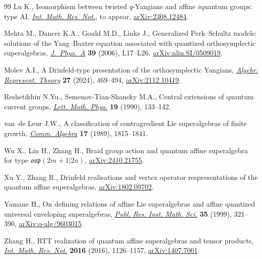 \begin{thebibliography}{99}
Lu K., Isomorphism between twisted $q$-Yangians and affine $i$quantum groups:
 type AI, \href{https://doi.org/10.1093/imrn/rnae248}{\textit{Int. Math. Res. Not.}}, {t}o appear, \href{https://arxiv.org/abs/2308.12484}{arXiv:2308.12484}.

Mehta M., Dancer K.A., Gould M.D., Links J., Generalized {P}erk--{S}chultz
 models: solutions of the {Y}ang--{B}axter equation associated with quantized
 orthosymplectic superalgebras, \href{https://doi.org/10.1088/0305-4470/39/1/L03}{\textit{J.~Phys.~A}} \textbf{39} (2006),
 L17--L26, \href{https://arxiv.org/abs/nlin.SI/0509019}{arXiv:nlin.SI/0509019}.

Molev A.I., A {D}rinfeld-type presentation of the orthosymplectic {Y}angians,
 \href{https://doi.org/10.1007/s10468-023-10227-9}{\textit{Algebr. Represent. Theory}} \textbf{27} (2024), 469--494,
 \href{https://arxiv.org/abs/2112.10419}{arXiv:2112.10419}.

Reshetikhin N.Yu., Semenov-Tian-Shansky M.A., Central extensions of quantum
 current groups, \href{https://doi.org/10.1007/BF01045884}{\textit{Lett. Math. Phys.}} \textbf{19} (1990), 133--142.

van~de Leur J.W., A classification of contragredient {L}ie superalgebras of
 finite growth, \href{https://doi.org/10.1080/00927878908823823}{\textit{Comm. Algebra}} \textbf{17} (1989), 1815--1841.

Wu X., Lin H., Zhang H., Braid group action and quantum affine superalgebra for
 type $\mathfrak{osp}(2m+1|2n)$, \href{https://arxiv.org/abs/2410.21755}{arXiv:2410.21755}.

Xu Y., Zhang R., Drinfeld realisations and vertex operator respresentations of
 the quantum affine superalgebras, \href{https://arxiv.org/abs/1802.09702}{arXiv:1802.09702}.

Yamane H., On defining relations of affine {L}ie superalgebras and affine
 quantized universal enveloping superalgebras, \href{https://doi.org/10.2977/prims/1195143607}{\textit{Publ. Res. Inst. Math.
 Sci.}} \textbf{35} (1999), 321--390, \href{https://arxiv.org/abs/q-alg/9603015}{arXiv:q-alg/9603015}.

Zhang H., R{TT} realization of quantum affine superalgebras and tensor
 products, \href{https://doi.org/10.1093/imrn/rnv167}{\textit{Int. Math. Res. Not.}} \textbf{2016} (2016), 1126--1157,
 \href{https://arxiv.org/abs/1407.7001}{arXiv:1407.7001}.


\end{thebibliography}

